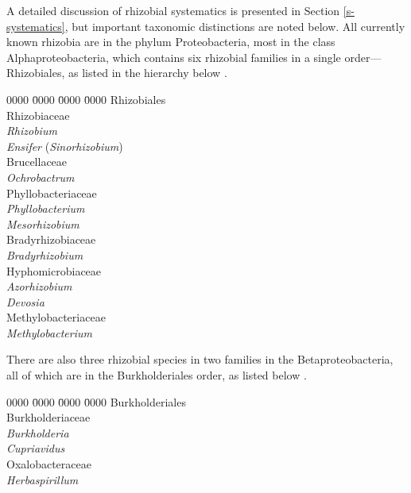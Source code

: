 A detailed discussion of rhizobial systematics is presented in
Section \ref{s-systematics}, but important taxonomic distinctions
are noted below. All currently known rhizobia are in the phylum
Proteobacteria, most in the class Alphaproteobacteria, which
contains six rhizobial families in a single order---Rhizobiales, as
listed in the hierarchy below \citep{Bergeys-outline}.

\singlespacing

\begin{tabbing}
  0000 \= 0000 \= 0000 \= 0000 \kill
  Rhizobiales \\
  \> Rhizobiaceae  \\
  \> \> \emph{Rhizobium} \\
  \> \> \emph{Ensifer} (\emph{Sinorhizobium}) \\
  \> Brucellaceae  \\
  \> \> \emph{Ochrobactrum} \\
  \> Phyllobacteriaceae  \\
  \> \> \emph{Phyllobacterium} \\
  \> \> \emph{Mesorhizobium} \\
  \> Bradyrhizobiaceae  \\
  \> \> \emph{Bradyrhizobium} \\
  \> Hyphomicrobiaceae  \\
  \> \> \emph{Azorhizobium} \\
  \> \> \emph{Devosia} \\
  \> Methylobacteriaceae  \\
  \> \> \emph{Methylobacterium} \\
\end{tabbing}

\onehalfspacing

There are also three rhizobial species in two families in the
Betaproteobacteria, all of which are in the Burkholderiales order,
as listed below \citep{Bergeys-outline}.

\singlespacing

\begin{tabbing}
  0000 \= 0000 \= 0000 \= 0000 \kill
  Burkholderiales \\
  \> Burkholderiaceae  \\
  \> \> \emph{Burkholderia} \\
  \> \> \emph{Cupriavidus} \\
  \> Oxalobacteraceae  \\
  \> \> \emph{Herbaspirillum} \\
\end{tabbing}

